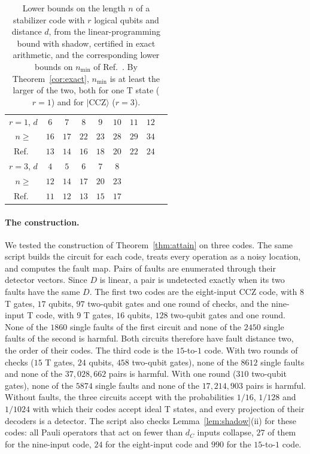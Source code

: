 \documentclass[aps,prl,reprint,twocolumn,amsmath,amssymb,floatfix,nofootinbib,superscriptaddress]{revtex4-2}
\theoremstyle{definition}
\theoremstyle{remark}
\newcommand{\CCZ}{\mathrm{CCZ}}
\begin{document}
\begin{table}[h]
\caption{Lower bounds on the length $n$ of a stabilizer code with $r$ logical qubits and distance $d$, from the linear-programming bound with shadow, certified in exact arithmetic, and the corresponding lower bounds on $n_{\min}$ of Ref.~\cite{distillationpaper}. By Theorem~\ref{cor:exact}, $n_{\min}$ is at least the larger of the two, both for one T state ($r=1$) and for $|\CCZ\rangle$ ($r=3$).}
\label{tab:lp}
\begin{ruledtabular}
\begin{tabular}{ccccccccc}
$r=1$, $d$ & $6$ & $7$ & $8$ & $9$ & $10$ & $11$ & $12$ & \\
$n\geq$ & $16$ & $17$ & $22$ & $23$ & $28$ & $29$ & $34$ & \\
Ref.~\cite{distillationpaper} & $13$ & $14$ & $16$ & $18$ & $20$ & $22$ & $24$ & \\
\hline
$r=3$, $d$ & $4$ & $5$ & $6$ & $7$ & $8$ & & & \\
$n\geq$ & $12$ & $14$ & $17$ & $20$ & $23$ & & & \\
Ref.~\cite{distillationpaper} & $11$ & $12$ & $13$ & $15$ & $17$ & & & \\
\end{tabular}
\end{ruledtabular}
\end{table}

\paragraph*{The construction.}
We tested the construction of Theorem~\ref{thm:attain} on three codes. The same script builds the circuit for each code, treats every operation as a noisy location, and computes the fault map. Pairs of faults are enumerated through their detector vectors. Since $D$ is linear, a pair is undetected exactly when its two faults have the same $D$. The first two codes are the eight-input CCZ code, with $8$ T gates, $17$ qubits, $97$ two-qubit gates and one round of checks, and the nine-input T code, with $9$ T gates, $16$ qubits, $128$ two-qubit gates and one round. None of the $1860$ single faults of the first circuit and none of the $2450$ single faults of the second is harmful. Both circuits therefore have fault distance two, the order of their codes. The third code is the $15$-to-$1$ code. With two rounds of checks ($15$ T gates, $24$ qubits, $458$ two-qubit gates), none of the $8612$ single faults and none of the $37{,}028{,}662$ pairs is harmful. With one round ($310$ two-qubit gates), none of the $5874$ single faults and none of the $17{,}214{,}903$ pairs is harmful. Without faults, the three circuits accept with the probabilities $1/16$, $1/128$ and $1/1024$ with which their codes accept ideal T states, and every projection of their decoders is a detector. The script also checks Lemma~\ref{lem:shadow}(ii) for these codes: all Pauli operators that act on fewer than $d_C$ inputs collapse, $27$ of them for the nine-input code, $24$ for the eight-input code and $990$ for the $15$-to-$1$ code.
\end{document}
